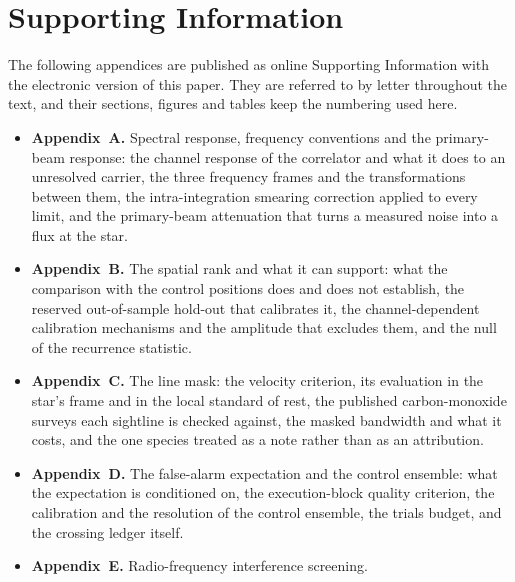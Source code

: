 \section*{Supporting Information}
\label{sec:si}
The following appendices are published as online Supporting Information with
the electronic version of this paper. They are referred to by letter
throughout the text, and their sections, figures and tables keep the
numbering used here.

\begin{itemize}[nosep,leftmargin=1.2em]
\item \textbf{Appendix~A.} Spectral response, frequency conventions and the
  primary-beam response: the channel response of the correlator and what it
  does to an unresolved carrier, the three frequency frames and the
  transformations between them, the intra-integration smearing correction
  applied to every limit, and the primary-beam attenuation that turns a
  measured noise into a flux at the star.
\item \textbf{Appendix~B.} The spatial rank and what it can support: what the
  comparison with the \NCtrl{} control positions does and does not establish,
  the reserved out-of-sample hold-out that calibrates it, the channel-dependent
  calibration mechanisms and the amplitude that excludes them, and the null of
  the recurrence statistic.
\item \textbf{Appendix~C.} The line mask: the velocity criterion, its
  evaluation in the star's frame and in the local standard of rest, the
  published carbon-monoxide surveys each sightline is checked against, the
  masked bandwidth and what it costs, and the one species treated as a note
  rather than as an attribution.
\item \textbf{Appendix~D.} The false-alarm expectation and the control
  ensemble: what the expectation is conditioned on, the execution-block
  quality criterion, the calibration and the resolution of the control
  ensemble, the trials budget, and the crossing ledger itself.
\item \textbf{Appendix~E.} Radio-frequency interference screening.
\end{itemize}
